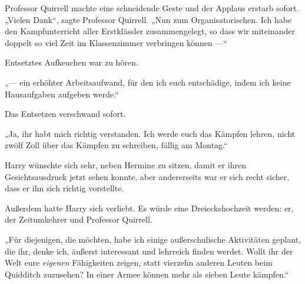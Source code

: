 Professor Quirrell machte eine schneidende Geste und der Applaus erstarb sofort.
„Vielen Dank“, sagte Professor Quirrell.
„Nun zum Organisatorischen. Ich habe den Kampfunterricht aller Erstklässler zusammengelegt, so dass wir miteinander doppelt so viel Zeit im Klassenzimmer verbringen können —“

Entsetztes Aufkeuchen war zu hören.

„— ein erhöhter Arbeitsaufwand, für den ich euch entschädige, indem ich keine Hausaufgaben aufgeben werde.“

Das Entsetzen verschwand sofort.

„Ja, ihr habt mich richtig verstanden. Ich werde euch das Kämpfen lehren, nicht zwölf Zoll über das Kämpfen zu schreiben, fällig am Montag.“

Harry wünschte sich sehr, neben Hermine zu sitzen, damit er ihren Gesichtsausdruck jetzt sehen konnte, aber andererseits war er sich recht sicher, dass er ihn sich richtig vorstellte.

Außerdem hatte Harry sich verliebt. Es würde eine Dreieckshochzeit werden: er, der Zeitumkehrer und Professor Quirrell.

„Für diejenigen, die möchten, habe ich einige außerschulische Aktivitäten geplant, die ihr, denke ich, äußerst interessant und lehrreich finden werdet. Wollt ihr der Welt eure \emph{eigenen} Fähigkeiten zeigen, statt vierzehn anderen Leuten beim Quidditch zuzusehen? In einer Armee können mehr als sieben Leute kämpfen.“

